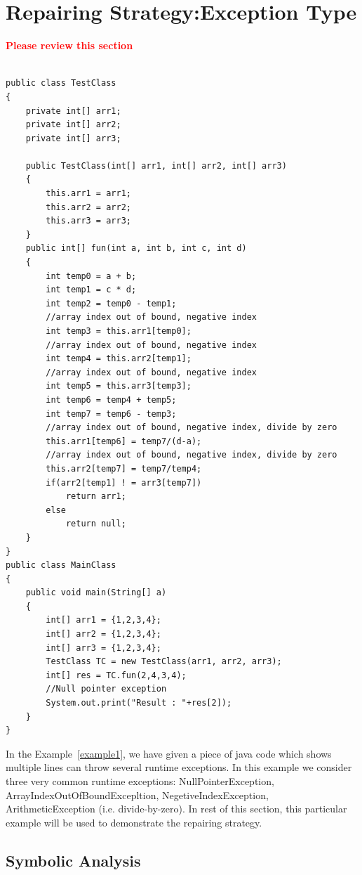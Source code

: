 \section{Repairing Strategy:Exception Type}
\label{sec:strgEx}

\textcolor{red}{\textbf{Please review this section}}\newline


\lstset{language=Java, caption=Java code which may throws runtime exceptions, label=example1}
\begin{lstlisting}

public class TestClass
{
	private int[] arr1;
	private int[] arr2;
	private int[] arr3;
		
	public TestClass(int[] arr1, int[] arr2, int[] arr3)
	{
		this.arr1 = arr1;
		this.arr2 = arr2;
		this.arr3 = arr3;
	}
	public int[] fun(int a, int b, int c, int d)
	{
		int temp0 = a + b;
		int temp1 = c * d;
		int temp2 = temp0 - temp1;
		//array index out of bound, negative index
		int temp3 = this.arr1[temp0];
		//array index out of bound, negative index
		int temp4 = this.arr2[temp1];
		//array index out of bound, negative index
		int temp5 = this.arr3[temp3];
		int temp6 = temp4 + temp5;
		int temp7 = temp6 - temp3;
		//array index out of bound, negative index, divide by zero
		this.arr1[temp6] = temp7/(d-a);
		//array index out of bound, negative index, divide by zero
		this.arr2[temp7] = temp7/temp4;
		if(arr2[temp1] ! = arr3[temp7])
			return arr1;
		else
			return null;
	}
}
public class MainClass 
{
	public void main(String[] a) 
	{
		int[] arr1 = {1,2,3,4};
		int[] arr2 = {1,2,3,4};
		int[] arr3 = {1,2,3,4};
		TestClass TC = new TestClass(arr1, arr2, arr3);
		int[] res = TC.fun(2,4,3,4);
		//Null pointer exception
		System.out.print("Result : "+res[2]);
	}    
}
\end{lstlisting}

In the Example~\ref{example1}, we have given a piece of java code which shows
multiple lines can throw several runtime exceptions.
In this example we consider three very common runtime exceptions:
NullPointerException, ArrayIndexOutOfBoundExcepltion, NegetiveIndexException,
ArithmeticException (i.e. divide-by-zero). In rest of this section, this
particular example will be used to demonstrate the repairing strategy.

\subsection{Symbolic Analysis}
\label{subsec:symb}


